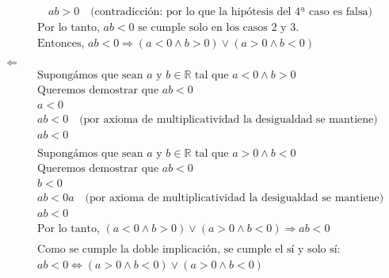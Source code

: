 \documentclass{article}
\begin{document}
\begin{align*}
&\quad \quad ab > 0 \quad \text{(contradicción: por lo que la hipótesis del 4ª caso es falsa)} \\
&\quad \text{Por lo tanto, } ab < 0 \text{ se cumple solo en los casos 2 y 3.} \\
&\quad \text{Entonces, } ab < 0 \Rightarrow (a < 0 \land b > 0) \lor (a>0 \land b<0) \\
\\
\text{$\Leftarrow$}\\
&\quad \text{Supongámos que sean } a \text{ y } b \in \mathbb{R} \text{ tal que } a < 0 \land b > 0 \\
&\quad \text{Queremos demostrar que } ab < 0 \\
&\quad a < 0 \\
&\quad ab < 0 \quad \text{(por axioma de multiplicatividad la desigualdad se mantiene)} \\
&\quad ab < 0 \\
\\
&\quad \text{Supongámos que sean } a \text{ y } b \in \mathbb{R} \text{ tal que } a > 0 \land b < 0 \\
&\quad \text{Queremos demostrar que } ab < 0 \\
&\quad b < 0 \\
&\quad ab < 0a \quad \text{(por axioma de multiplicatividad la desigualdad se mantiene)} \\
&\quad ab < 0 \\
&\quad \text{Por lo tanto, } (a < 0 \land b > 0) \lor (a > 0 \land b < 0) \Rightarrow ab < 0 \\
\\
&\quad \text{Como se cumple la doble implicación, se cumple el sí y solo sí:} \\
&\quad ab < 0 \iff (a > 0 \land b < 0) \lor (a > 0 \land b < 0)
\end{align*}
\end{document}

